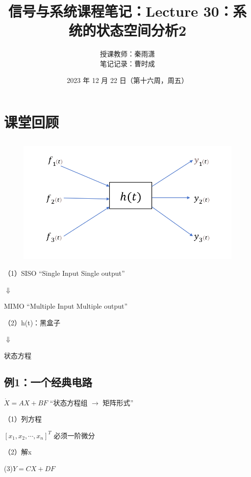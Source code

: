 \documentclass[UTF8]{ctexart}
\begin{document}
\title{信号与系统课程笔记：Lecture 30：系统的状态空间分析2}
\author{授课教师：秦雨潇 \\
        笔记记录：曹时成}
\date{2023 年 12 月 22 日（第十六周，周五）}
\maketitle

\section{课堂回顾}
\subsection{ }
\begin{figure}[h]
  \centering         %
  \includegraphics[scale=0.38]{1.png}
\end{figure}
（1）SISO   “Single Input Single output” \par
\qquad \quad $\Downarrow $ \par
\qquad MIMO   “Multiple Input Multiple output” \par
（2）h(t)：黑盒子 \par
\qquad \quad $\Downarrow $ \par
\qquad 状态方程 \par

\subsection{例1：一个经典电路}
$\dot{X} = AX+ BF $ \quad “状态方程组 $\longrightarrow $ 矩阵形式” \par
（1）列方程 \par
\qquad  $[ x_1,x_2,\cdots ,x_n]^T$ \quad  必须一阶微分 \par
（2）解x \par
 (3)$Y=CX+DF$ \par
\end{document}

